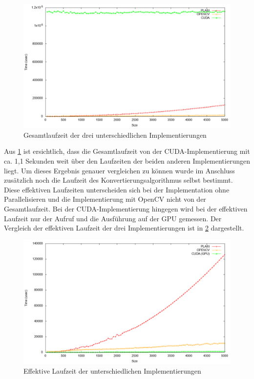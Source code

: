 \documentclass{llncs}
\begin{document}
\begin{figure}
	\centering
	\includegraphics[width=\textwidth,height=\textheight,keepaspectratio]{analysis.png}
	\caption{Gesamtlaufzeit der drei unterschiedlichen Implementierungen}
	\label{fig:analysis}
\end{figure}

Aus \ref{fig:analysis} ist ersichtlich, dass die Gesamtlaufzeit von der CUDA-Implementierung mit ca. 1,1 Sekunden weit über den Laufzeiten der beiden anderen Implementierungen liegt.
Um dieses Ergebnis genauer vergleichen zu können wurde im Anschluss zusätzlich noch die Laufzeit des Konvertierungsalgorithmus selbst bestimmt. Diese effektiven Laufzeiten unterscheiden sich bei der Implementation ohne Parallelisieren und die Implementierung mit OpenCV nicht von der Gesamtlaufzeit. Bei der CUDA-Implementierung hingegen wird bei der effektiven Laufzeit nur der Aufruf und die Ausführung auf der GPU gemessen. Der Vergleich der effektiven Laufzeit der drei Implementierungen ist in \ref{fig:analysis_gpu} dargestellt.

\begin{figure}
	\centering
	\includegraphics[width=\textwidth,height=\textheight,keepaspectratio]{analysis_gpu.png}
	\caption{Effektive Laufzeit der unterschiedlichen Implementierungen}
	\label{fig:analysis_gpu}
\end{figure}
\end{document}

